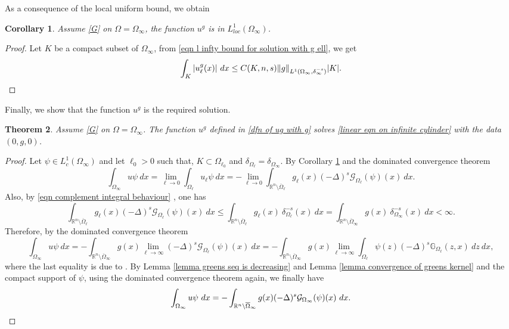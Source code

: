 \documentclass{amsart}
\newtheorem{theorem}{Theorem}[section]
\newtheorem{corollary}[theorem]{Corollary}
\newcommand{\R}{\mathbb{R}}
\newcommand{\slap}{(-\Delta)^{s}}
\newcommand{\g}[1]{\mathcal{G}_{#1}}
\newcommand{\gk}[1]{\mathbb{G}_{#1}}
\newcommand{\ul}{u_{\ell}}
\begin{document}
As a consequence of the local uniform bound, we obtain 
\begin{corollary}\label{prop v is l1 with g}
     Assume \ref{G} on $\Omega=\Omega_{\infty}$, the function $u^{g}$ is in $L^{1}_{loc}(\Omega_{\infty})$.
\end{corollary}
\begin{proof}
    Let $K$ be a compact subset of $\Omega_{\infty}$, from \eqref{eqn l infty bound for solution with g ell}, we get
    \begin{equation*}
        \int_{K}|\ul^{g}(x)|\ dx\leq C(K,n,s)\|g\|_{L^{1}(\Omega_{\infty},\delta_{\infty}^{-s})}|K|. \qedhere
    \end{equation*}
\end{proof}
Finally, we show that the function $u^{g}$ is the required solution.
\begin{theorem}\label{thrm gell convergeng to g}
    Assume \ref{G} on $\Omega=\Omega_{\infty}$. The function $u^{g}$ defined in \eqref{dfn of ug with g} solves \eqref{linear eqn on infinite cylinder} with the data $(0,g,0)$.
\end{theorem}
\begin{proof}
    Let $\psi\in L_{c}^{1}(\Omega_{\infty})$ and let $\ell_{0}>0$ such that, $K\subset \Omega_{\ell_{0}}$ and $\delta_{\Omega_{\ell}}=\delta_{\Omega_{\infty}}$. By Corollary \ref{prop v is l1 with g} and the dominated convergence theorem 
    \begin{equation*}
        \int_{\Omega_{\infty}}u\psi\ dx=\lim_{\ell\to 0} \int_{\Omega_{\ell}}\ul \psi \ dx =-\lim_{\ell\to 0} \int_{\R^{n}\setminus\overline{\Omega}_{\ell}}g_{\ell}(x) \slap \g{\Omega_{\ell}}(\psi)(x)\ dx.
    \end{equation*}
    Also, by \eqref{eqn complement integral behaviour} , one has 
    \begin{equation*}
        \int_{\R^{n}\setminus\overline{\Omega}_{\ell}}g_{\ell}(x) \slap \g{\Omega_{\ell}}(\psi)(x)\ dx\leq \int_{\R^{n}\setminus\overline{\Omega}_{\ell}}g_{\ell}(x)~\delta^{-s}_{\Omega_{\ell}}(x)\ dx= \int_{\R^{n}\setminus\overline{\Omega}_{\infty}}g(x)~\delta^{-s}_{\Omega_{\infty}}(x)\ dx<\infty.
    \end{equation*}
    Therefore, by the dominated convergence theorem 
    \begin{equation*}
        \int_{\Omega_{\infty}}u\psi\ dx=-\int_{\R^{n}\setminus\overline{\Omega}_{\infty}}g(x)\lim_{\ell\to \infty}\slap \g{\Omega_{\ell}}(\psi)(x)\ dx=-\int_{\R^{n}\setminus\overline{\Omega}_{\infty}}g(x) \lim_{\ell\to\infty}\int_{\Omega_{\ell}}\psi(z)\slap\gk{\Omega_{\ell}}(z,x)\ dz\ dx,
    \end{equation*}
    where the last equality is due to \cite[Lemma 3.7]{Abatangelo2015LargesHarmonic}. By Lemma \ref{lemma greens seq is decreasing} and Lemma \ref{lemma convergence of greens kernel} and the compact support of $\psi$, using the dominated convergence theorem again, we finally have
    \begin{equation*}
        \int_{\Omega_{\infty}}u \psi \ dx=-\int_{\R^{n}\setminus\overline{\Omega}_{\infty}}g(x)\slap \g{\Omega_{\infty}}(\psi)(x)\ dx.\qedhere
    \end{equation*}
\end{proof}
\end{document}
